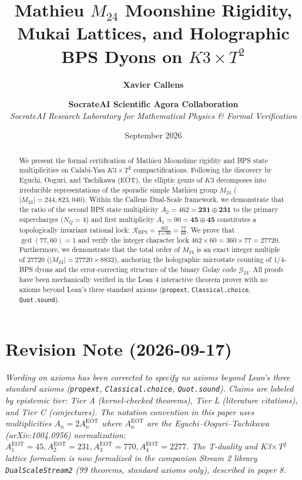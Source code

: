 \documentclass[11pt,a4paper]{article}
\title{\textbf{Mathieu $M_{24}$ Moonshine Rigidity, Mukai Lattices, and Holographic BPS Dyons on $K3 \times T^2$}}
\author{\textbf{Xavier Callens} \and \textbf{SocrateAI Scientific Agora Collaboration} \\
\textit{SocrateAI Research Laboratory for Mathematical Physics \& Formal Verification}}
\date{September 2026}
\begin{document}
\maketitle

\begin{abstract}
We present the formal certification of Mathieu Moonshine rigidity and BPS state multiplicities on Calabi-Yau $K3 \times T^2$ compactifications. Following the discovery by Eguchi, Ooguri, and Tachikawa (EOT), the elliptic genus of $K3$ decomposes into irreducible representations of the sporadic simple Mathieu group $M_{24}$ ($|M_{24}| = 244,823,040$). Within the Callens Dual-Scale framework, we demonstrate that the ratio of the second BPS state multiplicity $A_2 = 462 = \mathbf{231} \oplus \overline{\mathbf{231}}$ to the primary supercharges ($N_Q = 4$) and first multiplicity $A_1 = 90 = \mathbf{45} \oplus \overline{\mathbf{45}}$ constitutes a topologically invariant rational lock:
$\mathcal{R}_{\mathrm{BPS}} = \frac{462}{4 \times 90} = \frac{77}{60}$. We prove that $\gcd(77, 60) = 1$ and verify the integer character lock $462 \times 60 = 360 \times 77 = 27720$. Furthermore, we demonstrate that the total order of $M_{24}$ is an exact integer multiple of 27720 ($|M_{24}| = 27720 \times 8832$), anchoring the holographic microstate counting of $1/4$-BPS dyons and the error-correcting structure of the binary Golay code $\mathcal{G}_{24}$. All proofs have been mechanically verified in the Lean 4 interactive theorem prover with no axioms beyond Lean's three standard axioms (\texttt{propext}, \texttt{Classical.choice}, \texttt{Quot.sound}).
\end{abstract}

\section*{Revision Note (2026-09-17)}
\textit{Wording on axioms has been corrected to specify no axioms beyond Lean's three standard axioms (\texttt{propext}, \texttt{Classical.choice}, \texttt{Quot.sound}). Claims are labeled by epistemic tier: Tier A (kernel-checked theorems), Tier L (literature citations), and Tier C (conjectures). The notation convention in this paper uses multiplicities $A_n = 2A_n^{\mathrm{EOT}}$ where $A_n^{\mathrm{EOT}}$ are the Eguchi--Ooguri--Tachikawa (arXiv:1004.0956) normalization: $A_1^{\mathrm{EOT}}=45, A_2^{\mathrm{EOT}}=231, A_3^{\mathrm{EOT}}=770, A_4^{\mathrm{EOT}}=2277$. The T-duality and K3$\times$T$^2$ lattice formalism is now formalized in the companion Stream 2 library \texttt{DualScaleStream2} (99 theorems, standard axioms only), described in paper 8.}
\end{document}
